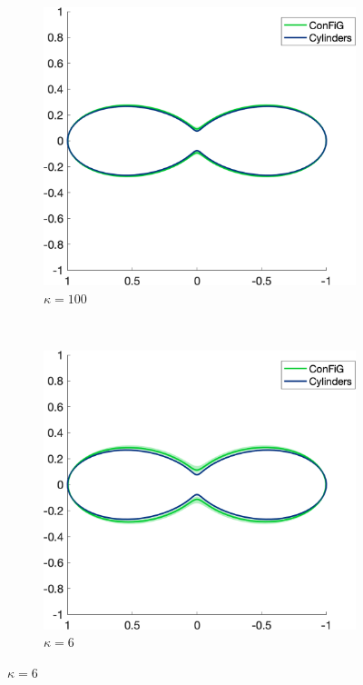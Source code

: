 \begin{figure}[h!]
  \centering
  \begin{subfigure}[]{0.4\textwidth}
    \includegraphics[width=\textwidth]{figures/frf_experiment/fibres_prctiles_kappa_100_b_2000.png}
    \caption{$\kappa = 100$}
  \end{subfigure}
  ~
  \begin{subfigure}[]{0.4\textwidth}
    \includegraphics[width=\textwidth]{figures/frf_experiment/fibres_prctiles_kappa_6_b_2000.png}
    \caption{$\kappa = 6$}
  \end{subfigure}


\end{figure}
